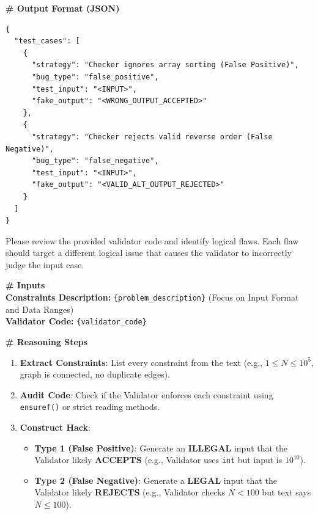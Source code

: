 \documentclass[11pt]{article}
\begin{document}
\begin{promptbox}
\vspace{0.5em}
\noindent\textbf{\# Output Format (JSON)}
\begin{lstlisting}[style=jsonstyle]
{
  "test_cases": [
    {
      "strategy": "Checker ignores array sorting (False Positive)",
      "bug_type": "false_positive",
      "test_input": "<INPUT>",
      "fake_output": "<WRONG_OUTPUT_ACCEPTED>"
    },
    {
      "strategy": "Checker rejects valid reverse order (False Negative)",
      "bug_type": "false_negative",
      "test_input": "<INPUT>",
      "fake_output": "<VALID_ALT_OUTPUT_REJECTED>"
    }
  ]
}
\end{lstlisting}
\end{promptbox}

\begin{promptbox}
\small
Please review the provided validator code and identify logical flaws. Each flaw should target a different logical issue that causes the validator to incorrectly judge the input case.

\vspace{0.5em}
\noindent\textbf{\# Inputs} \\
\textbf{Constraints Description:} \texttt{\{problem\_description\}} (Focus on Input Format and Data Ranges) \\
\textbf{Validator Code:} \texttt{\{validator\_code\}}

\vspace{0.5em}
\noindent\textbf{\# Reasoning Steps}
\begin{enumerate}
    \setlength\itemsep{0em}
    \item \textbf{Extract Constraints}: List every constraint from the text (e.g., $1 \le N \le 10^5$, graph is connected, no duplicate edges).
    \item \textbf{Audit Code}: Check if the Validator enforces each constraint using \texttt{ensuref()} or strict reading methods.
    \item \textbf{Construct Hack}:
    \begin{itemize}
        \item \textbf{Type 1 (False Positive)}: Generate an \textbf{ILLEGAL} input that the Validator likely \textbf{ACCEPTS} (e.g., Validator uses \texttt{int} but input is $10^{10}$).
        \item \textbf{Type 2 (False Negative)}: Generate a \textbf{LEGAL} input that the Validator likely \textbf{REJECTS} (e.g., Validator checks $N < 100$ but text says $N \le 100$).
    \end{itemize}
\end{enumerate}


\end{promptbox}
\end{document}
